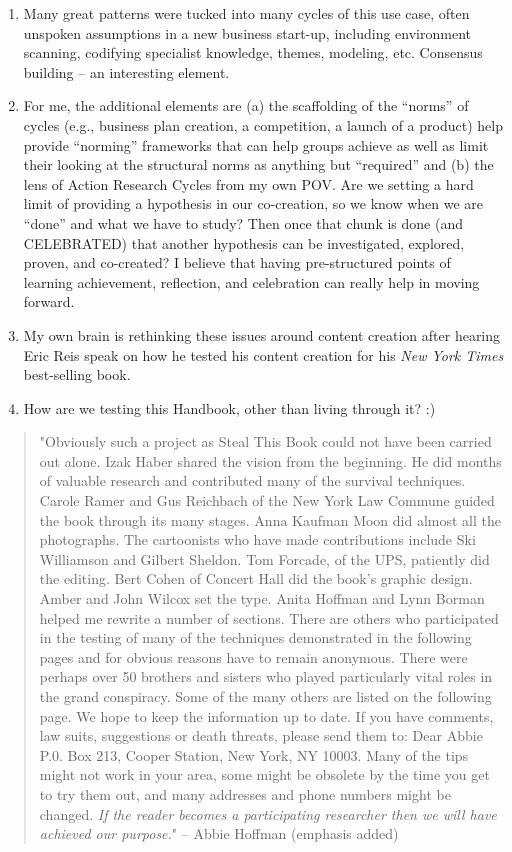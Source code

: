 \begin{enumerate}
\item
  Many great patterns were tucked into many cycles of this use case,
  often unspoken assumptions in a new business start-up, including
  environment scanning, codifying specialist knowledge, themes,
  modeling, etc. Consensus building -- an interesting element.
\item
  For me, the additional elements are (a) the scaffolding of the
  ``norms'' of cycles (e.g., business plan creation, a competition, a
  launch of a product) help provide ``norming'' frameworks that can help
  groups achieve as well as limit their looking at the structural norms
  as anything but ``required'' and (b) the lens of Action Research
  Cycles from my own POV. Are we setting a hard limit of providing a
  hypothesis in our co-creation, so we know when we are ``done'' and
  what we have to study? Then once that chunk is done (and CELEBRATED)
  that another hypothesis can be investigated, explored, proven, and
  co-created? I believe that having pre-structured points of learning
  achievement, reflection, and celebration can really help in moving
  forward.
\item
  My own brain is rethinking these issues around content creation after
  hearing Eric Reis speak on how he tested his content creation for his
  \emph{New York Times} best-selling book.
\item
  How are we testing this Handbook, other than living through it? :)
\end{enumerate}
\begin{quote}
"Obviously such a project as Steal This Book could not have been carried
out alone. Izak Haber shared the vision from the beginning. He did
months of valuable research and contributed many of the survival
techniques. Carole Ramer and Gus Reichbach of the New York Law Commune
guided the book through its many stages. Anna Kaufman Moon did almost
all the photographs. The cartoonists who have made contributions include
Ski Williamson and Gilbert Sheldon. Tom Forcade, of the UPS, patiently
did the editing. Bert Cohen of Concert Hall did the book's graphic
design. Amber and John Wilcox set the type. Anita Hoffman and Lynn
Borman helped me rewrite a number of sections. There are others who
participated in the testing of many of the techniques demonstrated in
the following pages and for obvious reasons have to remain anonymous.
There were perhaps over 50 brothers and sisters who played particularly
vital roles in the grand conspiracy. Some of the many others are listed
on the following page. We hope to keep the information up to date. If
you have comments, law suits, suggestions or death threats, please send
them to: Dear Abbie P.0. Box 213, Cooper Station, New York, NY 10003.
Many of the tips might not work in your area, some might be obsolete by
the time you get to try them out, and many addresses and phone numbers
might be changed. \emph{If the reader becomes a participating researcher
then we will have achieved our purpose.}" -- Abbie Hoffman (emphasis
added)
\end{quote}
